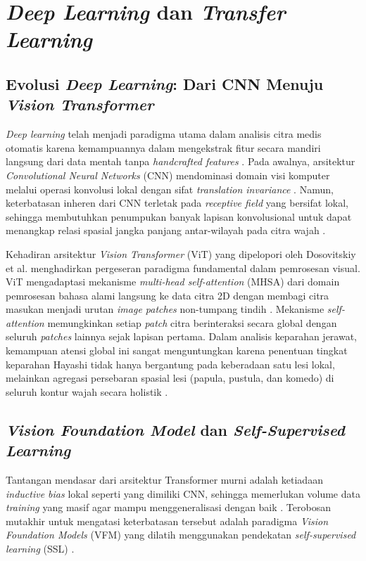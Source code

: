 
\section{\textit{Deep Learning} dan \textit{Transfer Learning}}

\subsection{Evolusi \textit{Deep Learning}: Dari CNN Menuju \textit{Vision Transformer}}
\textit{Deep learning} telah menjadi paradigma utama dalam analisis citra medis otomatis karena kemampuannya dalam mengekstrak fitur secara mandiri langsung dari data mentah tanpa \textit{handcrafted features} \cite{jain2021, islam2023}. Pada awalnya, arsitektur \textit{Convolutional Neural Networks} (CNN) mendominasi domain visi komputer melalui operasi konvolusi lokal dengan sifat \textit{translation invariance} \cite{jain2021}. Namun, keterbatasan inheren dari CNN terletak pada \textit{receptive field} yang bersifat lokal, sehingga membutuhkan penumpukan banyak lapisan konvolusional untuk dapat menangkap relasi spasial jangka panjang antar-wilayah pada citra wajah \cite{dosovitskiy2020image}.

Kehadiran arsitektur \textit{Vision Transformer} (ViT) yang dipelopori oleh Dosovitskiy et al. \cite{dosovitskiy2020image} menghadirkan pergeseran paradigma fundamental dalam pemrosesan visual. ViT mengadaptasi mekanisme \textit{multi-head self-attention} (MHSA) dari domain pemrosesan bahasa alami langsung ke data citra 2D dengan membagi citra masukan menjadi urutan \textit{image patches} non-tumpang tindih \cite{dosovitskiy2020image}. Mekanisme \textit{self-attention} memungkinkan setiap \textit{patch} citra berinteraksi secara global dengan seluruh \textit{patches} lainnya sejak lapisan pertama. Dalam analisis keparahan jerawat, kemampuan atensi global ini sangat menguntungkan karena penentuan tingkat keparahan Hayashi tidak hanya bergantung pada keberadaan satu lesi lokal, melainkan agregasi persebaran spasial lesi (papula, pustula, dan komedo) di seluruh kontur wajah secara holistik \cite{lin2022, simeoni2025dinov3}.

\subsection{\textit{Vision Foundation Model} dan \textit{Self-Supervised Learning}}
Tantangan mendasar dari arsitektur Transformer murni adalah ketiadaan \textit{inductive bias} lokal seperti yang dimiliki CNN, sehingga memerlukan volume data \textit{training} yang masif agar mampu menggeneralisasi dengan baik \cite{dosovitskiy2020image}. Terobosan mutakhir untuk mengatasi keterbatasan tersebut adalah paradigma \textit{Vision Foundation Models} (VFM) yang dilatih menggunakan pendekatan \textit{self-supervised learning} (SSL) \cite{oquab2023dinov2, simeoni2025dinov3}.

